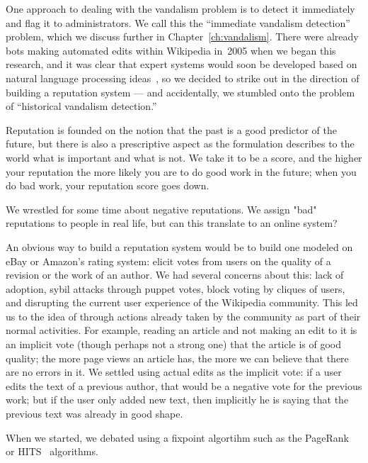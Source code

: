 One approach to dealing with the vandalism problem is to detect
it immediately and flag it to administrators.
We call this the ``immediate vandalism detection'' problem,
which we discuss further in Chapter~\ref{ch:vandalism}.
There were already bots making automated edits within Wikipedia
in~2005 when we began this research, and it was clear that
expert systems would soon be developed based on natural language processing
ideas~\cite{wiki:AntiVandalBot,wiki:MartinBot,wiki:ClueBot,Carter2007},
so we decided to strike out in the direction of building a reputation system
--- and accidentally, we stumbled onto the problem of
``historical vandalism detection.''


Reputation is founded on the notion that the past is a good
predictor of the future, but there is also a prescriptive aspect
as the formulation describes to the world what is important and
what is not.
We take it to be a score, and the higher your reputation the more
likely you are to do good work in the future; when you do bad
work, your reputation score goes down.

We wrestled for some time about negative reputations. We assign "bad"
reputations to people in real life, but can this translate to an online
system?  

An obvious way to build a reputation system would be to build one
modeled on eBay or Amazon's rating system: elicit votes from users
on the quality of a revision or the work of an author.
We had several concerns about this: lack of adoption, sybil attacks
through puppet votes, block voting by cliques of users, and
disrupting the current user experience of the Wikipedia community.
This led us to the idea of  through
actions already taken by the community as part of their normal activities.
For example, reading an article and not making an edit to it is
an implicit vote (though perhaps not a strong one)
that the article is of good quality; the more page views an article
has, the more we can believe that there are no errors in it.
We settled using actual edits as the implicit vote: if a
user edits the text of a previous author, that would be a
negative vote for the previous work; but if the user only added
new text, then implicitly he is saying that the previous text
was already in good shape.

When we started, we debated using a fixpoint algortihm
such as the PageRank~\cite{Page1999} or HITS~\cite{Kleinberg1999}
algorithms.

